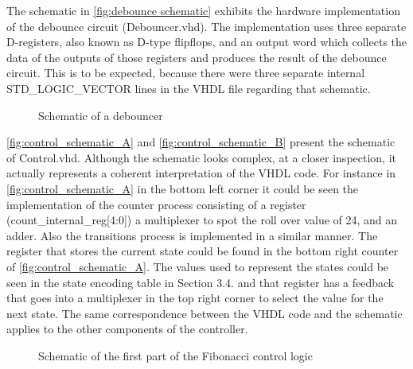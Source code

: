 \documentclass[10pt]{article}
\begin{document}
The schematic in \autoref{fig:debounce schematic} exhibits the hardware implementation of the debounce circuit (Debouncer.vhd). The implementation uses three separate D-registers, also known as D-type flipflops, and an output word which collects the data of the outputs of those registers and produces the result of the debounce circuit. This is to be expected, because there were three separate internal STD\_LOGIC\_VECTOR lines in the VHDL file regarding that schematic.
\begin{figure}[ht]
    \centering
    \caption{Schematic of a debouncer}
    \label{fig:debounce_schematic_B}
\end{figure}
\newpage

\autoref{fig:control_schematic_A} and \autoref{fig:control_schematic_B} present the schematic of Control.vhd. Although the schematic looks complex, at a closer inspection, it actually represents a coherent interpretation of the VHDL code. For instance in \autoref{fig:control_schematic_A} in the bottom left corner it could be seen the implementation of the counter process consisting of a register (count\_internal\_reg[4:0]) a multiplexer to spot the roll over value of 24, and an adder.
Also the transitions process is implemented in a similar manner. The register that stores the current state could be found in the bottom right counter of \autoref{fig:control_schematic_A}. The values used to represent the states could be seen in the state encoding table in Section 3.4. and that register has a feedback that goes into a multiplexer in the top right corner to select the value for the next state.
The same correspondence between the VHDL code and the schematic applies to the other components of the controller. 

\begin{figure}[ht]
    \centering
    \caption{Schematic of the first part of the Fibonacci control logic}
    \label{fig:control_schematic_A}
\end{figure}
\end{document}
